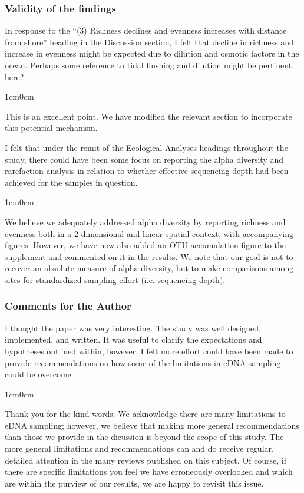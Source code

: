 \documentclass{article}
\newenvironment{response}
	{
	\begin{adjustwidth}{1cm}{0cm}
	\color{peerjBlue}
	}
	{
	\end{adjustwidth}
	}
\begin{document}
\subsubsection*{Validity of the findings}
In response to the ``(3) Richness declines and evenness increases with distance from shore'' heading in the Discussion section, I felt that decline in richness and increase in evenness might be expected due to dilution and osmotic factors in the ocean. Perhaps some reference to tidal flushing and dilution might be pertinent here?
\begin{response}
  This is an excellent point. We have modified the relevant section to incorporate this potential mechanism.
	\\
\end{response}

I felt that under the remit of the Ecological Analyses headings throughout the study, there could have been some focus on reporting the alpha diversity and rarefaction analysis in relation to whether effective sequencing depth had been achieved for the samples in question.
\begin{response}
  We believe we adequately addressed alpha diversity by reporting richness and evenness both in a 2-dimensional and linear spatial context, with accompanying figures.
	However, we have now also added an OTU accumulation figure to the supplement and commented on it in the results.
	We note that our goal is not to recover an absolute measure of alpha diversity, but to make comparisons among sites for standardized sampling effort (i.e. sequencing depth).
	\\
\end{response}

\subsubsection*{Comments for the Author}
I thought the paper was very interesting. The study was well designed, implemented, and written. It was useful to clarify the expectations and hypotheses outlined within, however, I felt more effort could have been made to provide recommendations on how some of the limitations in eDNA sampling could be overcome.
\begin{response}
  Thank you for the kind words.
	We acknowledge there are many limitations to eDNA sampling; however, we believe that making more general recommendations than those we provide in the dicussion is beyond the scope of this study.
	The more general limitations and recommendations can and do receive regular, detailed attention in the many reviews published on this subject.
	Of course, if there are specific limitations you feel we have erroneously overlooked and which are within the purview of our results, we are happy to revisit this issue.
	\\
\end{response}
\end{document}
